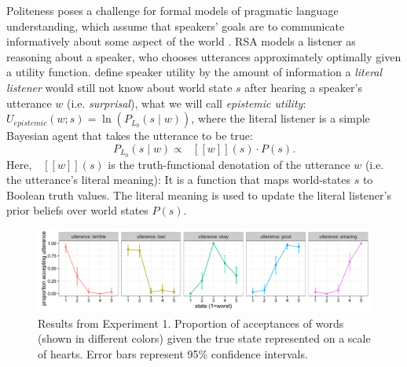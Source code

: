 \documentclass[10pt,letterpaper]{article}
\newcommand{\denote}[1]{\mbox{ $[\![ #1 ]\!]$}}
\begin{document}
Politeness poses a challenge for formal models of pragmatic language understanding, which assume that speakers' goals are to communicate informatively about some aspect of the world \cite{Frank2012, Goodman2013}.
RSA models a listener as reasoning about a speaker, who chooses utterances approximately optimally given a utility function.
 define speaker utility by the amount of information a \emph{literal listener} would still not know about world state $s$ after hearing a speaker's utterance $w$ (i.e. \emph{surprisal}), what we will call \emph{epistemic utility}:
$U_{epistemic}(w; s) = \ln(P_{L_0}(s \mid w)) $,
where the literal listener is a simple Bayesian agent that takes the utterance to be true:
\begin{equation}
P_{L_0}(s \mid w)\propto \denote{w}(s) \cdot P(s) \label{eq:L0}.
\end{equation}
Here, $\denote{w}(s)$ is the truth-functional denotation of the utterance $w$ (i.e. the utterance's literal meaning): It is a function that maps world-states $s$ to Boolean truth values.
The literal meaning is used to update the literal listener's prior beliefs over world states $P(s)$.
%
\begin{figure}[!b]
\begin{center}
  \includegraphics[width=.9\textwidth]{figures/exp1.pdf}
  \caption{\label{fig:exp1} Results from Experiment 1. Proportion of acceptances of words (shown in different colors) given the true state represented on a scale of hearts. Error bars represent 95\% confidence intervals.}
  \end{center}
\end{figure}
%
%
\end{document}
